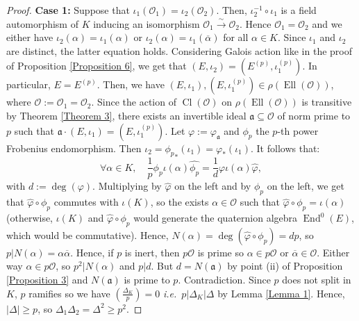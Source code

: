 \documentclass[a4paper,10pt]{report}
\theoremstyle{definition}
\theoremstyle{plain}
\theoremstyle{definition}
\newcommand{\ie}{\emph{i.e.}\ }
\newcommand{\mO}{\mathcal{O}}
\renewcommand{\(}{\left(}
\renewcommand{\)}{\right)}
\newcommand{\mf}[1]{\mathfrak{#1}}
\DeclareMathOperator{\End}{End}
\DeclareMathOperator{\Cl}{Cl}
\DeclareMathOperator{\Ell}{Ell}
\begin{document}
\begin{proof}
\textbf{Case 1:} Suppose that $\iota_1(\mO_1)=\iota_2(\mO_2)$. Then, $\iota_2^{-1}\circ\iota_1$ is a field automorphism of $K$ inducing an isomorphism $\mO_1\overset{\sim}{\longrightarrow}\mO_2$. Hence $\mO_1=\mO_2$ and we either have $\iota_2(\alpha)=\iota_1(\alpha)$ or $\iota_2(\alpha)=\iota_1(\overline{\alpha})$ for all $\alpha\in K$.  Since $\iota_1$ and $\iota_2$ are distinct, the latter equation holds. Considering Galois action like in the proof of Proposition \ref{Proposition 6}, we get that $(E,\iota_2)=(E^{(p)},\iota_1^{(p)})$. In particular, $E=E^{(p)}$. Then, we have $(E,\iota_1),(E,\iota_1^{(p)})\in\rho(\Ell(\mO))$, where $\mO:=\mO_1=\mO_2$. Since the action of $\Cl(\mO)$ on $\rho(\Ell(\mO))$ is transitive by Theorem \ref{Theorem 3}, there exists an invertible ideal $\mf{a}\subseteq\mO$ of norm prime to $p$ such that $\mf{a}\cdot(E,\iota_1)=(E,\iota_1^{(p)})$.  Let $\varphi:=\varphi_{\mf{a}}$ and $\phi_p$ the $p$-th power Frobenius endomorphism. Then $\iota_2={\phi_p}_*(\iota_1)=\varphi_*(\iota_1)$. It follows that:
\[\forall\alpha\in K, \quad \frac{1}{p}\phi_p\iota(\alpha)\widehat{\phi_p}=\frac{1}{d}\varphi\iota(\alpha)\widehat{\varphi},\]
with $d:=\deg(\varphi)$. Multiplying by $\widehat{\varphi}$ on the left and by $\phi_p$ on the left, we get that $\widehat{\varphi}\circ\phi_p$ commutes with $\iota(K)$, so the exists $\alpha\in\mO$ such that $\widehat{\varphi}\circ\phi_p=\iota(\alpha)$ (otherwise, $\iota(K)$ and $\widehat{\varphi}\circ\phi_p$ would generate the quaternion algebra $\End^0(E)$, which would be commutative). Hence, $N(\alpha)=\deg(\widehat{\varphi}\circ\phi_p)=dp$, so $p|N(\alpha)=\alpha\overline{\alpha}$. Hence, if $p$ is inert, then $p\mO$ is prime so $\alpha\in p\mO$ or $\overline{\alpha}\in\mO$. Either way $\alpha\in p\mO$, so $p^2|N(\alpha)$ and $p|d$. But $d=N(\mf{a})$ by point (ii) of Proposition \ref{Proposition 3} and $N(\mf{a})$ is prime to $p$. Contradiction. Since $p$ does not split in $K$, $p$ ramifies so we have $\(\frac{\Delta_K}{p}\)=0$ \ie $p|\Delta_K|\Delta$ by Lemma \ref{Lemma 1}.  Hence, $|\Delta|\geq p$, so $\Delta_1\Delta_2=\Delta^2\geq p^2$.


\end{proof}
\end{document}
